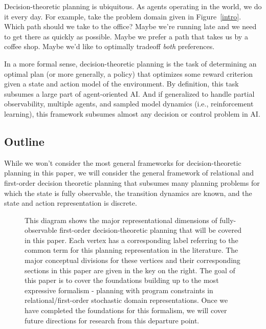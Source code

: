 Decision-theoretic planning is ubiquitous.  As agents operating in the
world, we do it every day.  For example, take the problem domain given
in Figure~\ref{intro}.  Which path should we take to the office?
Maybe we're running late and we need to get there as quickly as
possible.  Maybe we prefer a path that takes us by a coffee shop.
Maybe we'd like to optimally tradeoff \emph{both} preferences.

In a more formal sense, decision-theoretic planning is the task of
determining an optimal plan (or more generally, a policy) that
optimizes some reward criterion given a state and action model of the
environment.  By definition, this task subsumes a large part of
agent-oriented AI.  And if generalized to
handle partial observability, multiple agents, and sampled model dynamics
(i.e., reinforcement learning),
this framework subsumes almost any decision or control
problem in AI.

\subsection{Outline}

While we won't consider the most general frameworks for
decision-theoretic planning in this paper, we will consider the
general framework of relational and first-order decision theoretic
planning that subsumes many planning problems for which the state is
fully observable, the transition dynamics are known, and the state
and action representation is discrete.

\begin{figure}[t!]

\begin{center}
\end{center}
\caption{This diagram shows the major representational dimensions of fully-observable
first-order decision-theoretic planning that will be covered in this
paper.  Each vertex has a corresponding label referring to the
common term for this planning representation in the literature.  The
major conceptual divisions for these vertices and their corresponding
sections in this paper are given in the key on the right.  The goal of this paper
is to cover the foundations building up to the most expressive formalism - 
planning with program constraints in relational/first-order stochastic domain
representations.  Once we have completed the foundations for this formalism, 
we will cover future directions for research from this departure point.}
\label{dims}

\end{figure}

